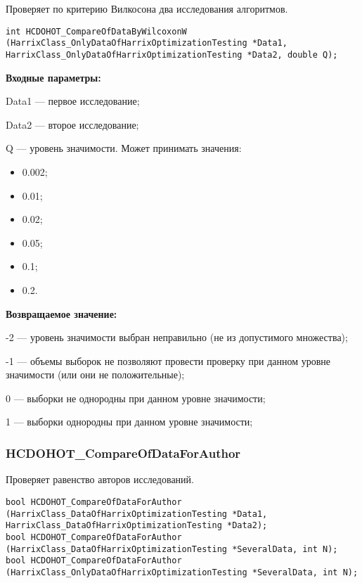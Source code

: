 \documentclass[a4paper,12pt]{article}
\begin{document}
Проверяет по критерию Вилкосона два исследования алгоритмов.


\begin{lstlisting}[label=code_syntax_HCDOHOT_CompareOfDataByWilcoxonW,caption=Синтаксис]
int HCDOHOT_CompareOfDataByWilcoxonW (HarrixClass_OnlyDataOfHarrixOptimizationTesting *Data1, HarrixClass_OnlyDataOfHarrixOptimizationTesting *Data2, double Q);
\end{lstlisting}

\textbf{Входные параметры:}

 
Data1 --- первое исследование;
 
    Data2 --- второе исследование;
 
    Q --- уровень значимости. Может принимать значения:
 
    \begin{itemize}
\item 0.002; 
\item 0.01; 
\item 0.02; 
\item 0.05; 
\item 0.1; 
\item 0.2.
\end{itemize}

\textbf{Возвращаемое значение:}

 
 -2 --- уровень значимости выбран неправильно (не из допустимого множества);
 
    -1 --- объемы выборок не позволяют провести проверку при данном уровне значимости (или они не положительные);
 
    0 --- выборки не однородны  при данном уровне значимости;
 
    1 --- выборки однородны  при данном уровне значимости;


\subsubsection{HCDOHOT\_CompareOfDataForAuthor}\label{HCDOHOT_CompareOfDataForAuthor}

Проверяет равенство авторов исследований.


\begin{lstlisting}[label=code_syntax_HCDOHOT_CompareOfDataForAuthor,caption=Синтаксис]
bool HCDOHOT_CompareOfDataForAuthor (HarrixClass_DataOfHarrixOptimizationTesting *Data1, HarrixClass_DataOfHarrixOptimizationTesting *Data2);
bool HCDOHOT_CompareOfDataForAuthor (HarrixClass_DataOfHarrixOptimizationTesting *SeveralData, int N);
bool HCDOHOT_CompareOfDataForAuthor (HarrixClass_OnlyDataOfHarrixOptimizationTesting *SeveralData, int N);
\end{lstlisting}
\end{document}
